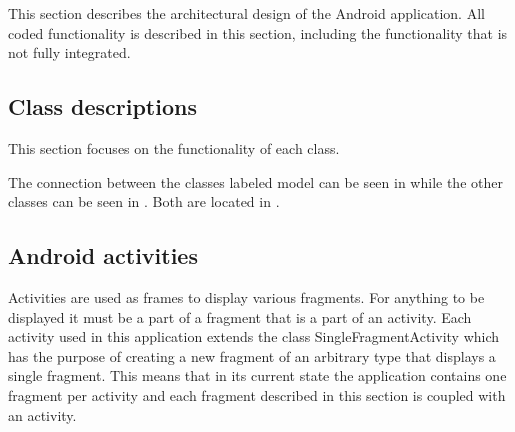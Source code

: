 This section describes the architectural design of the Android application. All coded functionality is described in this section, including the functionality that is not fully integrated. 
\subsection{Class descriptions}\label{sec:and_classdescription}
This section focuses on the functionality of each class. %

The connection between the classes labeled model can be seen in
 while the other classes can be seen in
. Both are located in .

\subsection{Android activities}

Activities are used as frames to display various fragments. For anything to be
displayed it must be a part of a fragment that is a part of an activity. Each
activity used in this application extends the class SingleFragmentActivity which
has the purpose of creating a new fragment of an arbitrary type that displays a
single fragment. This means that in its current state the application contains
one fragment per activity and each fragment described in this section is coupled
with an activity.

